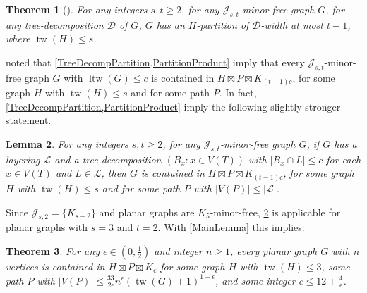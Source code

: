 \documentclass[11pt]{article}
\newcommand{\JJ}{\mathcal{J}}
\newcommand{\DD}{\mathcal{D}}
\renewcommand{\geq}{\geqslant}
\renewcommand{\leq}{\leqslant}
\newcommand{\StrongProd}{\mathbin{\boxtimes}}
\DeclareMathOperator{\ltw}{ltw}
\DeclareMathOperator{\tw}{tw}
\theoremstyle{plain}
\newtheorem{thm}{Theorem}
\newtheorem{lem}[thm]{Lemma}
\theoremstyle{definition}
\newcommand{\PP}{\mathcal{P}}
\newcommand{\LL}{\mathcal{L}}
\begin{document}
		\begin{thm}[\citep{ISW24}]
			\label{TreeDecompPartition}
			For any integers $s,t \geq 2$, for any $\JJ_{s,t}$-minor-free graph $G$, for any tree-decomposition $\DD$ of $G$, $G$ has an $H$-partition of $\DD$-width at most $t-1$, where $\tw(H)\leq s$.
		\end{thm}
		
		\citet{ISW24} noted that \cref{TreeDecompPartition,PartitionProduct} imply that every $\JJ_{s,t}$-minor-free graph $G$ with $\ltw(G)\leq c$ is contained in $H\boxtimes P\boxtimes K_{(t-1)c}$, for some graph $H$ with $\tw(H)\leq s$ and for some path $P$. In fact, \cref{TreeDecompPartition,PartitionProduct} imply the following slightly stronger statement. 
		
		\begin{lem}
			\label{LayeringTreeDecompProduct}
			For any integers $s, t \geq 2$, for any $\JJ_{s,t}$-minor-free graph $G$, if $G$ has a layering $\LL$ and a tree-decomposition $(B_x:x\in V(T))$ with $|B_x\cap L|\leq c$ for each $x\in V(T)$ and $L\in\LL$, then $G$ is contained in $H\boxtimes P\boxtimes K_{(t-1)c}$, for some graph $H$ with $\tw(H)\leq s$ and for some path $P$ with $|V(P)|\leq|\LL|$. 
		\end{lem}
		
		Since $\JJ_{s,2}=\{K_{s+2}\}$ and planar graphs are $K_5$-minor-free, \cref{LayeringTreeDecompProduct} is applicable for planar graphs with $s=3$ and $t=2$. With \cref{MainLemma} this implies:
		
		
		
		\begin{thm}
			\label{PGPST-tw-nonplanar} 
			For any $\epsilon\in (0,\frac12)$ and  integer $n\geq 1$, every planar graph $G$ with $n$ vertices is contained in $H \StrongProd P \StrongProd K_c$ for some graph $H$ with $\tw(H)\leq 3$, some path $P$ with $|V(P)|\leq 
			\frac{33}{2\epsilon} n^\epsilon (\tw(G)+1)^{1-\epsilon}$, and some integer $c\leq 12 +\frac{4}{\epsilon}$.
		\end{thm}
		
\end{document}
